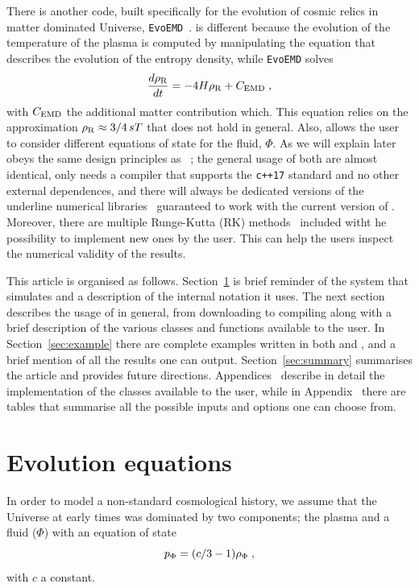 \documentclass[11pt,a4paper]{article}
\begin{document}
There is another code, built specifically for the evolution of cosmic relics in matter dominated Universe, {\tt EvoEMD}~\cite{Dutra:2021phm}. \nsc is different because the evolution of the temperature of the plasma is computed by manipulating the equation that describes the evolution of the entropy density, while {\tt EvoEMD} solves
%
\begin{equation}
	\dfrac{d\rho_{\rm R}}{dt} = -4H\rho_{\rm R} + C_{\rm EMD} \;,
	\label{eq:EvoMD}
\end{equation}
%
with  $C_{\rm EMD}$ the additional matter contribution which. This equation relies on the approximation $\rho_{\rm R} \approx 3/4 \, sT$ that does not hold in general. Also, \nsc allows the user to consider different equations of state for the fluid, $\Phi$. 
%
As we will explain later \nsc obeys the same design principles as \mimes~\cite{Karamitros:2021nxi}; \ie the general usage of both are almost identical, \nsc only needs a \CPP compiler that supports the {\tt c++17} standard and no other external dependences, and there will always be dedicated versions of the underline numerical libraries~\cite{NaBBODES,SimpleSplines} guaranteed to work with the current version of \nsc. Moreover, there are multiple Runge-Kutta (RK) methods~\cite{NaBBODES} included witht he possibility to implement new ones by the user. This can help the users inspect the numerical validity of the results.

This article is organised as follows. Section~\ref{sec:equations} is brief reminder of the system that \nsc simulates and a description of the internal notation it uses. The next section describes the usage of \nsc in general, from downloading to compiling along with a brief description of the various classes and functions available to the user. In Section~\ref{sec:example} there are complete examples written in both \CPP and \PY, and a brief mention of all the results one can output. Section~\ref{sec:summary} summarises the article and provides future directions.
%
Appendices~ describe in detail the implementation of the classes available to the user, while in Appendix~ there are tables that summarise all the possible inputs and options one can choose from. 

\section{Evolution equations}\label{sec:equations}
\setcounter{equation}{0}

In order to model a non-standard cosmological history, we assume that the Universe at early times was dominated by two components; the plasma and a fluid ($\Phi$) with an equation of state
%
\begin{equation}
	p_{\Phi} = (c/3-1) \rho_{\Phi} \;,
	\label{eq:EOS}
\end{equation}  
%
with $c$ a constant. 
\end{document}
